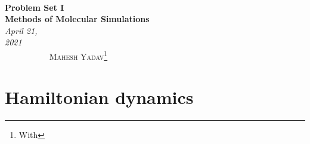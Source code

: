 \documentclass[12pt]{article}
\newcommand{\uv}[1]{\ensuremath{\mathbf{\hat{#1}}}} %
\renewcommand{\=}[1]{\stackrel{#1}{=}} %
\theoremstyle{definition}
\begin{document}
{\noindent\Huge\bf  \\[0.5\baselineskip] {\selectfont  Problem Set I}         }\\[2\baselineskip] %
{ {\bf {}\selectfont Methods of Molecular Simulations}\\ {\textit{\selectfont     April  21, 2021}}}~~~~~~~~~~~~~~~~~~~~~~~~~~~~~~~~~~~~~~~~~~~~~~~~~~~~~~~~~~~~~~~~~~~~~~~~~~~~~    {\large \textsc{Mahesh Yadav}\footnote{With }} %
\\[1.4\baselineskip] 



\section{Hamiltonian dynamics}
\end{document}
